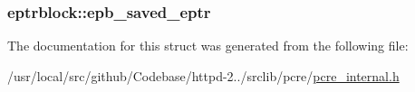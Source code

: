 \subsubsection[{\texorpdfstring{epb\+\_\+saved\+\_\+eptr}{epb_saved_eptr}}]{ eptrblock\+::epb\+\_\+saved\+\_\+eptr}\hypertarget{structeptrblock_a8d7fa8b39b2731ce4def4c1150e1eb54}{}\label{structeptrblock_a8d7fa8b39b2731ce4def4c1150e1eb54}


The documentation for this struct was generated from the following file\+:\begin{DoxyCompactItemize}
\item 
/usr/local/src/github/\+Codebase/httpd-\/2../srclib/pcre/\hyperlink{pcre__internal_8h}{pcre\+\_\+internal.\+h}\end{DoxyCompactItemize}
